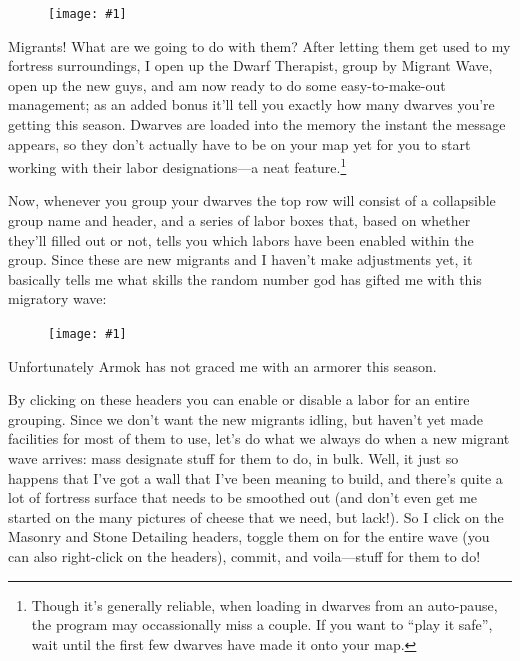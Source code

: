 \documentclass[]{article}
\newcommand{\fullfigure}[1] {
\begin{figure}[h!]
\texttt{[image: \#1]}
\end{figure}
}
\newcommand{\fullfigurecaption}[1] {
\begin{center}
\vspace{-12pt}
#1
\end{center}
}
\begin{document}
\fullfigure{Sec2Fig8}

Migrants! What are we going to do with them? After letting them get used to my fortress surroundings, I
open up the Dwarf Therapist, group by Migrant Wave, open up the new guys, and am now ready to do some
easy-to-make-out management; as an added bonus it'll tell you exactly how many dwarves you're getting
this season. Dwarves are loaded into the memory the instant the message appears, so they
don't actually have to be on your map yet for you to start working with their labor designations---a
neat feature.\footnote{Though it's generally reliable, when loading in dwarves from an auto-pause, the
program may occassionally miss a couple. If you want to ``play it safe'', wait until the first few
dwarves have made it onto your map.}

Now, whenever you group your dwarves the top row will consist of a collapsible group name and header, and
a series of labor boxes that, based on whether they'll filled out or not, tells you which labors have
been enabled within the group. Since these are new migrants and I haven't make adjustments yet, it
basically tells me what skills the random number god has gifted me with this migratory wave:

\fullfigure{Sec2Fig9}
\fullfigurecaption{Unfortunately Armok has not graced me with an armorer this season.}

By clicking on these headers you can enable or disable a labor for an entire grouping. Since we don't
want the new migrants idling, but haven't yet made facilities for most of them to use, let's do what we
always do when a new migrant wave arrives: mass designate stuff for them to do, in bulk. Well, it just so
happens that I've got a wall that I've been meaning to build, and there's quite a lot of fortress surface
that needs to be smoothed out (and don't even get me started on the many pictures of cheese that we need,
but lack!). So I click on the Masonry and Stone Detailing headers, toggle them on for the entire wave
(you can also right-click on the headers), commit, and voila---stuff for them to do!
\end{document}
